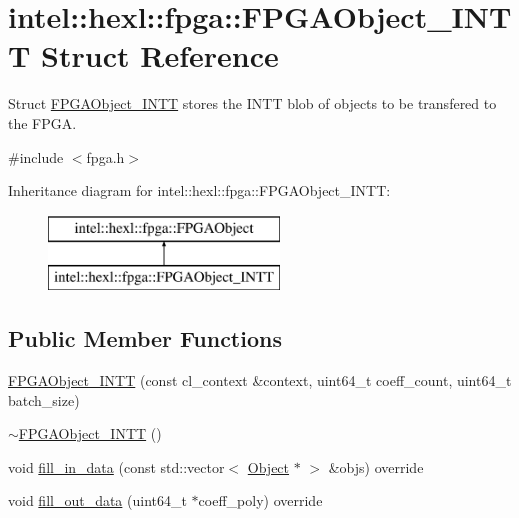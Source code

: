 \hypertarget{structintel_1_1hexl_1_1fpga_1_1FPGAObject__INTT}{\section{intel\-:\-:hexl\-:\-:fpga\-:\-:F\-P\-G\-A\-Object\-\_\-\-I\-N\-T\-T Struct Reference}
\label{structintel_1_1hexl_1_1fpga_1_1FPGAObject__INTT}
}


Struct \hyperlink{structintel_1_1hexl_1_1fpga_1_1FPGAObject__INTT}{F\-P\-G\-A\-Object\-\_\-\-I\-N\-T\-T} stores the I\-N\-T\-T blob of objects to be transfered to the F\-P\-G\-A.  




{\ttfamily \#include $<$fpga.\-h$>$}

Inheritance diagram for intel\-:\-:hexl\-:\-:fpga\-:\-:F\-P\-G\-A\-Object\-\_\-\-I\-N\-T\-T\-:\begin{figure}[H]
\begin{center}
\leavevmode
\includegraphics[height=2.000000cm]{structintel_1_1hexl_1_1fpga_1_1FPGAObject__INTT}
\end{center}
\end{figure}
\subsection*{Public Member Functions}
\begin{DoxyCompactItemize}
\item 
\hyperlink{structintel_1_1hexl_1_1fpga_1_1FPGAObject__INTT_a153585cd172743a16e84efd8659aa66c}{F\-P\-G\-A\-Object\-\_\-\-I\-N\-T\-T} (const cl\-\_\-context \&context, uint64\-\_\-t coeff\-\_\-count, uint64\-\_\-t batch\-\_\-size)
\item 
\hyperlink{structintel_1_1hexl_1_1fpga_1_1FPGAObject__INTT_a7cedf64bc8c7af8f1a77dd68e9dd2037}{$\sim$\-F\-P\-G\-A\-Object\-\_\-\-I\-N\-T\-T} ()
\item 
void \hyperlink{structintel_1_1hexl_1_1fpga_1_1FPGAObject__INTT_a3af9d73a583150a06fee9288a7938e31}{fill\-\_\-in\-\_\-data} (const std\-::vector$<$ \hyperlink{structintel_1_1hexl_1_1fpga_1_1Object}{Object} $\ast$ $>$ \&objs) override
\item 
void \hyperlink{structintel_1_1hexl_1_1fpga_1_1FPGAObject__INTT_a18c10384468f7e39f15b2059fe59d5db}{fill\-\_\-out\-\_\-data} (uint64\-\_\-t $\ast$coeff\-\_\-poly) override
\end{DoxyCompactItemize}
